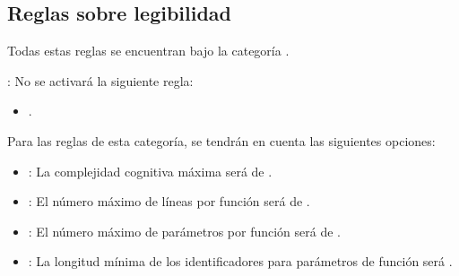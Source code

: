 \subsection{Reglas sobre legibilidad}

Todas estas reglas se encuentran bajo la categoría .

: No se activará la siguiente regla:
\begin{itemize}

\item {}.

\end{itemize}

Para las reglas de esta categoría, se tendrán en cuenta las siguientes
opciones:

\begin{itemize}

\item {}:
La complejidad cognitiva máxima será de .

\item {}:
El número máximo de líneas por función será de .

\item {}:
El número máximo de parámetros por función será de .

\item {}:
La longitud mínima de los identificadores para parámetros de función será .

\end{itemize}
